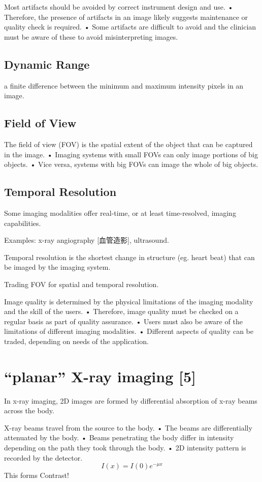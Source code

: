 \documentclass[UTF8,a4paper,11pt]{book}
\theoremstyle{mystyle}{
  \newtheorem{example}{Example}
}
\begin{document}
Most artifacts should be avoided by correct
instrument design and use.
• Therefore, the presence of artifacts in an
image likely suggests maintenance or quality
check is required.
• Some artifacts are difficult to avoid and the
clinician must be aware of these to avoid
misinterpreting images.


\section{Dynamic Range}
a finite difference
between the minimum and maximum
intensity pixels in an image.

\section{Field of View}
The field of view (FOV) is the spatial extent of
the object that can be captured in the image.
• Imaging systems with small FOVs can only
image portions of big objects.
• Vice versa, systems with big FOVs can image
the whole of big objects.


\section{Temporal Resolution}
Some imaging modalities offer real-time, or at
least time-resolved, imaging capabilities.

 Examples: x-ray angiography [血管造影], ultrasound.

 Temporal resolution is the shortest change in
structure (eg. heart beat) that can be imaged
by the imaging system.

Trading FOV for spatial and temporal resolution.

Image quality is determined by the physical
limitations of the imaging modality and the
skill of the users.
• Therefore, image quality must be checked on
a regular basis as part of quality assurance.
• Users must also be aware of the limitations of
different imaging modalities.
• Different aspects of quality can be traded,
depending on needs of the application.




\chapter{``planar'' X-ray imaging [5]}
 In x-ray imaging, 2D images are formed by
differential absorption of x-ray beams across
the body.

 X-ray beams travel from the source to the
body.
• The beams are differentially attenuated by the
body.
• Beams penetrating the body differ in intensity
depending on the path they took through the
body.
• 2D intensity pattern is recorded by the
detector.
\[
I(x)=I(0)e^{-\mu x}
\]
This forms Contrast!
\end{document}
